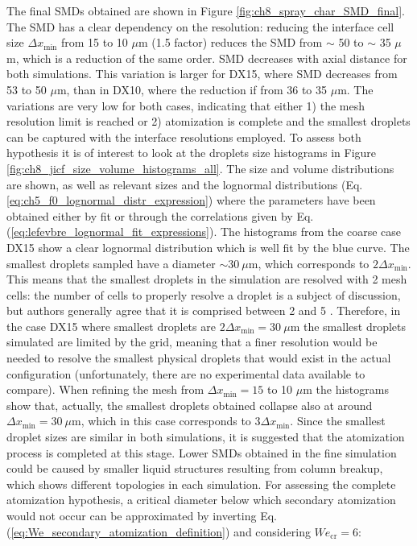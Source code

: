 The final SMDs obtained are shown in Figure \ref{fig:ch8_spray_char_SMD_final}. The SMD has a clear dependency on the resolution: reducing the interface cell size $\Delta x_\mathrm{min}$ from 15 to 10 $\mu$m (1.5 factor) reduces the SMD from $\sim$ 50 to $\sim$ 35 $\mu$m, which is a reduction of the same order. SMD decreases with axial distance for both simulations. This variation is larger for DX15, where SMD decreases from 53 to 50 $\mu$m, than in DX10, where the reduction if from 36 to 35 $\mu$m. The variations are very low for both cases, indicating that either 1) the mesh resolution limit is reached or 2) atomization is complete and the smallest droplets can be captured with the interface resolutions employed. To assess both hypothesis it is of interest to look at the droplets size histograms in Figure \ref{fig:ch8_jicf_size_volume_histograms_all}.  The size and volume distributions are shown, as well as relevant sizes and the lognormal distributions (Eq. \ref{eq:ch5_f0_lognormal_distr_expression}) where the parameters have been obtained either by fit or through the correlations given by Eq. (\ref{eq:lefevbre_lognormal_fit_expressions}). The histograms from the coarse case DX15 show a clear lognormal distribution which is well fit by the blue curve. The smallest droplets sampled have a diameter $\sim 30~\mu$m, which corresponds to $2\Delta x_\mathrm{min}$. This means that the smallest droplets in the simulation are resolved with 2 mesh cells: the number of cells to properly resolve a droplet is a subject of discussion, but authors generally agree that it is comprised between 2  and 5 . Therefore, in the case DX15 where smallest droplets are $2\Delta x_\mathrm{min} = 30~\mu$m the smallest droplets simulated are limited by the grid, meaning that a finer resolution would be needed to resolve the smallest physical droplets that would exist in the actual configuration (unfortunately, there are no experimental data available to compare). When refining the mesh from $\Delta x_\mathrm{min} = 15$ to 10 $\mu$m the histograms show that, actually, the smallest droplets obtained collapse also at around $\Delta x_\mathrm{min} = 30~\mu$m, which in this case corresponds to $3 \Delta x_\mathrm{min}$. Since the smallest droplet sizes are similar in both simulations, it is suggested that the atomization process is completed at this stage. Lower SMDs obtained in the fine simulation could be caused by smaller liquid structures resulting from column breakup, which shows different topologies in each simulation. For assessing the complete atomization hypothesis, a critical diameter below which secondary atomization would not occur can be approximated by inverting Eq. (\ref{eq:We_secondary_atomization_definition}) and considering $We_\mathrm{cr} = 6$:

